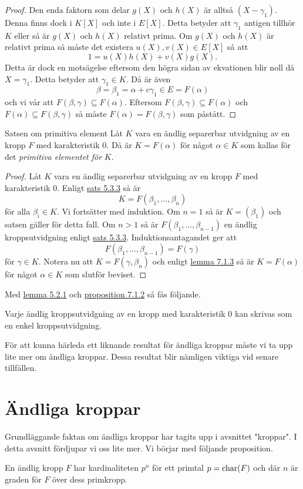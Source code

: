 \documentclass{article}
\newcommand{\kar}[0]{\textnormal{char}}
\theoremstyle{definition}
\begin{document}
\begin{proof}
  Den enda faktorn som delar $g(X)$ och $h(X)$ är alltså $(X - \gamma_1)$. Denna finns dock i $K[X]$ och inte i $E[X]$. Detta betyder att 
  $\gamma_1$ antigen tillhör $K$ eller så är $g(X)$ och $h(X)$ relativt prima. Om $g(X)$ och $h(X)$ är relativt prima så måste 
  det existera $u(X), v(X) \in E[X]$ så att
  \[1 = u(X)h(X) + v(X)g(X).\]
  Detta är dock en motsägelse eftersom den högra sidan av ekvationen blir noll då $X = \gamma_1.$ Detta betyder att $\gamma_1 \in K.$ Då är även 
  \[\beta = \beta_1 = \alpha + c\gamma_1 \in E = F(\alpha)\]
  och vi vår att $F(\beta, \gamma) \subseteq F(\alpha)$. Eftersom $F(\beta, \gamma) \subseteq F(\alpha)$ och $F(\alpha) \subseteq F(\beta, \gamma)$
  så måste $F(\alpha) = F(\beta, \gamma)$ som påstått.
\end{proof}

\begin{mytheo}{Satsen om primitiva element}{}
  Låt $K$ vara en ändlig separerbar utvidgning av en kropp $F$ med karakteristik 0. Då är $K = F(\alpha)$ för något $\alpha \in K$ som kallas 
  för det \textit{primitiva elementet för} $K$.
\end{mytheo}

\begin{proof}
  Låt $K$ vara en ändlig separerbar utvidgning av en kropp $F$ med karakteristik 0. Enligt \hyperlink{sats5.3.3}{sats 5.3.3} så är 
  \[K = F(\beta_1, \ldots, \beta_n)\]
  för alla $\beta_i \in K.$ Vi fortsätter med induktion. Om $n = 1$ så är $K = (\beta_1)$ och satsen gäller för detta fall. Om $n > 1$ 
  så är $F(\beta_1, \ldots, \beta_{n-1})$ en ändlig kroppsutvidgning enligt \hyperlink{sats5.3.3}{sats 5.3.3}. Induktionsantagandet ger att 
  \[ F(\beta_1, \ldots, \beta_{n-1}) = F(\gamma) \]
  för $\gamma \in K$. Notera nu att $K = F(\gamma, \beta_n)$ och enligt \hyperlink{lemma7.1.3}{lemma 7.1.3} så är $K = F(\alpha)$ för något $\alpha \in K$
  som slutför beviset.
\end{proof}

Med \hyperlink{algebraiskkropp}{lemma 5.2.1} och \hyperlink{prop7.1.2}{proposition 7.1.2} så fås följande.
\begin{mykol}{}{}
  Varje ändlig kroppsutvidgning av en kropp med karakteristik 0 kan skrivas som en enkel kroppsutvidgning.
\end{mykol}
För att kunna härleda ett liknande resultat för ändliga kroppar måste vi ta upp lite mer om ändliga kroppar. Dessa resultat blir nämligen viktiga 
vid senare tillfällen. 

\section{Ändliga kroppar}
Grundläggande faktan om ändliga kroppar har tagits upp i avsnittet "kroppar". I detta avsnitt fördjupar vi oss lite mer. Vi börjar med 
följande proposition. 
\begin{myprop}{}{}
  En ändlig kropp $F$ har kardinaliteten $p^n$ för ett primtal $p = \kar(F)$ och där $n$ är graden för $F$ över dess primkropp.
\end{myprop}
\end{document}
